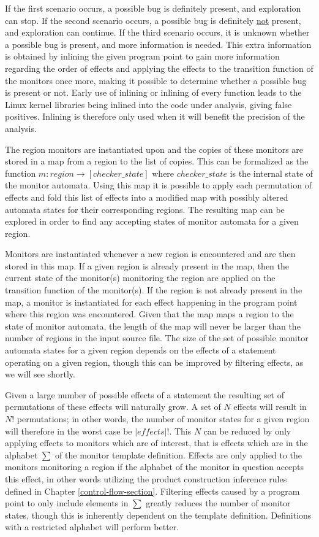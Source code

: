 \newpar If the first scenario occurs, a possible bug is definitely present, and exploration can stop. If the second scenario occurs, a possible bug is definitely \underline{not} present, and exploration can continue. If the third scenario occurs, it is unknown whether a possible bug is present, and more information is needed. This extra information is obtained by inlining the given program point to gain more information regarding the order of effects and applying the effects to the transition function of the monitors once more, making it possible to determine whether a possible bug is present or not. Early use of inlining or inlining of every function leads to the Linux kernel libraries being inlined into the code under analysis, giving false positives. Inlining is therefore only used when it will benefit the precision of the analysis. 

\newpar The region monitors are instantiated upon and the copies of these monitors are stored in a map from a region to the list of copies. This can be formalized as the function $m: region \rightarrow { [checker\_state] }$ where $ checker\_state $ is the internal state of the monitor automata. Using this map it is possible to apply each permutation of effects and fold this list of effects into a modified map with possibly altered automata states for their corresponding regions. The resulting map can be explored in order to find any accepting states of monitor automata for a given region. 

\newpar Monitors are instantiated whenever a new region is encountered and are then stored in this map. If a given region is already present in the map, then the current state of the monitor(s) monitoring the region are applied on the transition function of the monitor(s). If the region is not already present in the map, a monitor is instantiated for each effect happening in the program point where this region was encountered. Given that the map maps a region to the state of monitor automata, the length of the map will never be larger than the number of regions in the input source file. The size of the set of possible monitor automata states for a given region depends on the effects of a statement operating on a given region, though this can be improved by filtering effects, as we will see shortly. 

\newpar Given a large number of possible effects of a statement the resulting set of permutations of these effects will naturally grow. A set of $N$ effects will result in $N!$ permutations; in other words, the number of monitor states for a given region will therefore in the worst case be $|\mathit{effects}|!$. This $N$ can be reduced by only applying effects to monitors which are of interest, that is effects which are in the alphabet $\sum$ of the monitor template definition. Effects are only applied to the monitors monitoring a region if the alphabet of the monitor in question accepts this effect, in other words utilizing the product construction inference rules defined in Chapter \ref{control-flow-section}.  Filtering effects caused by a program point to only include elements in $\sum$ greatly reduces the number of monitor states, though this is inherently dependent on the template definition. Definitions with a restricted alphabet will perform better. 

